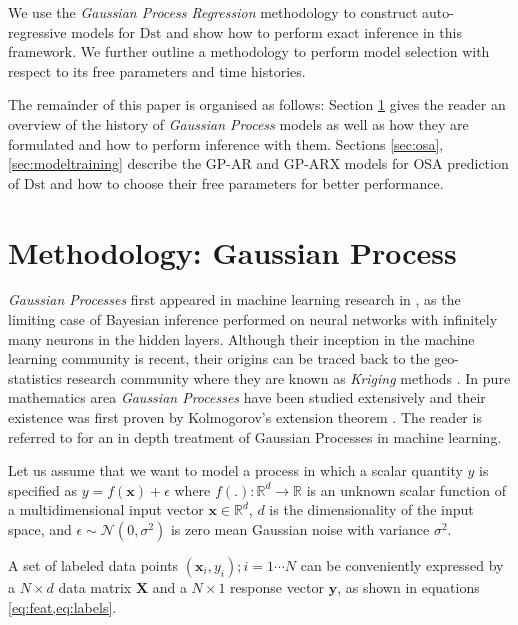 We use the \emph{Gaussian Process Regression} methodology to construct auto-regressive models for $ \mathrm{Dst}$ and show how to perform exact inference in this framework. We further outline a methodology to perform model selection with respect to its free parameters and time histories.

The remainder of this paper is organised as follows: Section \ref{sec:osaGPmethod} gives the reader an overview of the history of \emph{Gaussian Process} models as well as how they are formulated and how to perform inference with them. Sections \ref{sec:osa}, \ref{sec:modeltraining} describe the GP-AR and GP-ARX models for OSA prediction of $ \mathrm{Dst}$ and how to choose their free parameters for better performance. 

\section{Methodology: Gaussian Process} \label{sec:osaGPmethod}

\emph{Gaussian Processes} first appeared in machine learning research in \citet{Neal:1996:BLN:525544}, as the limiting case of Bayesian inference performed on neural networks with infinitely many neurons in the hidden layers. Although their inception in the machine learning community is recent, their origins can be traced back to the geo-statistics research community where they are known as \emph{Kriging} methods 
\citep{krige1951statistical}. In pure mathematics area \emph{Gaussian Processes} have been studied extensively and their existence was first proven by Kolmogorov's extension theorem \citep{tao2011introduction}. 
The reader is referred to \citet{Rasmussen:2005:GPM:1162254} for an in depth treatment of Gaussian Processes in machine learning.

Let us assume that we want to model a process in which a scalar quantity $y$ is specified as $y = f(\mathbf{x}) + \epsilon$ where   $f(.): \mathbb{R}^d \rightarrow \mathbb{R}$ is an unknown scalar function of a multidimensional input vector $\mathbf{x} \in \mathbb{R}^d$, $d$ is the dimensionality of the input space, and $\epsilon \sim \mathcal{N}(0, \sigma^2)$ is zero mean Gaussian noise with variance $\sigma^2$.

A set of labeled data points ${(\mathbf{x}_i, y_i); i = 1 \cdots N}$ can be conveniently expressed by a $N \times d$ data matrix $\mathbf{X}$ and a $N \times 1$ response vector $\mathbf{y}$, as shown in equations 
\cref{eq:feat,eq:labels}.


